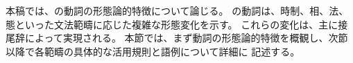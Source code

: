 本稿では、\langname の動詞の形態論的特徴について論じる。
\langname の動詞は、時制、相、法、態といった文法範疇に応じた複雑な形態変化を示す。
これらの変化は、主に接尾辞によって実現される。
本節では、まず動詞の形態論的特徴を概観し、次節以降で各範疇の具体的な活用規則と語例について詳細に
記述する。